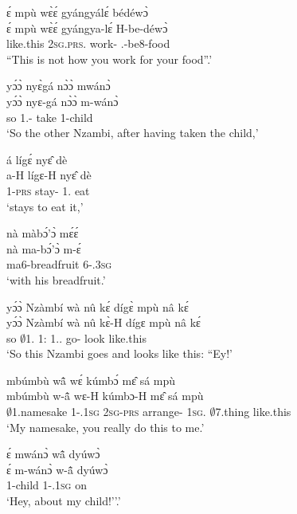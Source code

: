 \begin{exe}[(N234)]
\exN\label{n97}
  \glll ɛ́ mpù wɛ̀ɛ́ gyángyálɛ́ bédéwɔ̀ \\
       ɛ́ mpù wɛ̀ɛ́ gyángya-lɛ́ H-be-déwɔ̀ \\
        {\LOC} like.this 2\textsc{sg}.\textsc{prs}.{\NEG} work-{\NEG} {\OBJ}.{\LINK}-be8-food \\
    \trans ``This is not how you work for your food''.'
 
\exN\label{n98}
  \glll yɔ́ɔ̀ nyɛ̀gá nɔ̀ɔ̀ mwánɔ̀ \\
        yɔ́ɔ̀ nyɛ-gá nɔ̀ɔ̀ m-wánɔ̀ \\
       so 1.{\SBJ}-{\CONTR} take {\N}1-child  \\
    \trans `So the other Nzambi, after having taken the child,'
 
\exN\label{n99}
  \glll á lígɛ́ nyɛ̂ dè \\
        a-H lígɛ-H nyɛ̂ dè \\
       1-\textsc{prs} stay-{\R} 1.{\OBJ} eat  \\
    \trans `stays to eat it,'
 
\exN\label{n100}
  \glll nà màbɔ́'ɔ̀ mɛ́ɛ́ \\
       nà ma-bɔ́'ɔ̀ m-ɛ́ \\
       {\COM} ma6-breadfruit 6-{\POSS}.3\textsc{sg} \\
    \trans `with his breadfruit.'
 
\exN\label{n101}
  \glll yɔ́ɔ̀ Nzàmbí wà nû kɛ́ dígɛ̀ mpù nâ kɛ́ \\
       yɔ́ɔ̀ Nzàmbí wà nû kɛ̀-H dígɛ mpù nâ kɛ́ \\
       so $\emptyset$1.{\PN}  1:{\ATT}  1.{\DEM}.{\PROX} go-{\R} look like.this {\COMP} {\EXCL}\\
    \trans `So this Nzambi goes and looks like this: ``Ey!'
 
\exN\label{n102}
  \glll mbúmbù wã̂ wɛ́ kúmbɔ́ mɛ̂ sá mpù \\
          mbúmbù w-ã̂ wɛ-H kúmbɔ-H mɛ̂ sá mpù \\
        $\emptyset$1.namesake 1-{\POSS}.1\textsc{sg} 2\textsc{sg}-\textsc{prs} arrange-{\R} 1\textsc{sg}.{\OBJ} $\emptyset$7.thing like.this \\
    \trans `My namesake, you really do this to me.'
 
\exN\label{n103}
  \glll ɛ́ mwánɔ̀ wã̂ dyúwɔ̀ \\
       ɛ́ m-wánɔ̀ w-ã̂ dyúwɔ̀ \\
        {\EXCL} {\N}1-child 1-{\POSS}.1\textsc{sg} on \\
    \trans `Hey, about my child!''.'
 

\end{exe}

